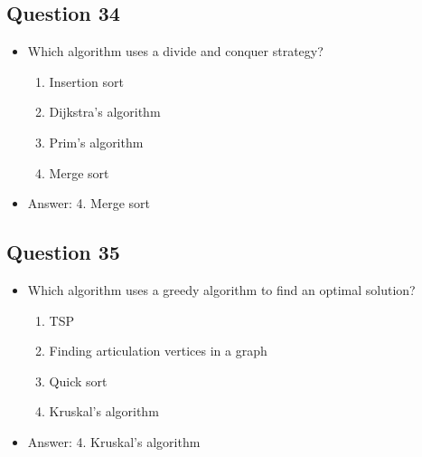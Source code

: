 \begin{slide}
\section[-1]{Question 34}

\begin{PauseHighLight}
  \begin{itemize}
  \item Which algorithm uses a divide and conquer strategy?
    \begin{enumerate}
    \item Insertion sort
    \item Dijkstra's algorithm
    \item Prim's algorithm
    \item Merge sort\pause
    \end{enumerate}
  \item Answer: 4. Merge sort\pauseb
  \end{itemize}
\end{PauseHighLight}
\end{slide}

\begin{slide}
\section[-1]{Question 35}

\begin{PauseHighLight}
  \begin{itemize}
  \item Which algorithm uses a greedy algorithm to find an optimal solution?
    \begin{enumerate}
    \item TSP
    \item Finding articulation vertices in a graph
    \item Quick sort
    \item Kruskal's algorithm\pause
    \end{enumerate}
  \item Answer: 4. Kruskal's algorithm\pauseb
  \end{itemize}
\end{PauseHighLight}
\end{slide}

